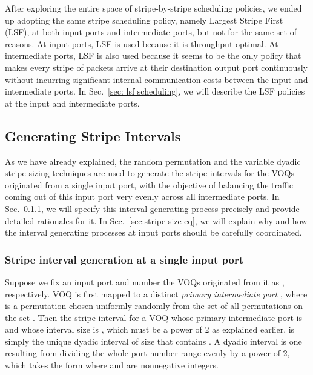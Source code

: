After exploring the entire space of stripe-by-stripe scheduling policies,
we ended up adopting the same stripe scheduling policy, namely Largest Stripe First (LSF),
at both input ports and intermediate ports, but not for the same set of reasons.
At input ports, LSF is used because it is throughput optimal.
At intermediate ports,
LSF is also used because it seems to be the only policy that makes every stripe of packets arrive at their destination output port
continuously without incurring significant internal communication costs between the input and intermediate ports.
In Sec.~\ref{sec: lsf scheduling},
we will describe the LSF policies at the input and intermediate ports.



















\subsection{Generating Stripe Intervals}
\label{sec:stripe generation}



As we have already explained, the random permutation and the variable dyadic stripe sizing techniques are used to
generate the stripe intervals for the  VOQs originated from a single input port, with the objective of 
balancing the traffic coming out of this input port very evenly across all  intermediate ports.
In Sec.~\ref{subsec: size determination}, 
we will specify this interval generating process precisely and provide detailed rationales for it.  
In Sec.~\ref{sec:stripe size eq}, we will 
explain why and how the interval generating processes at  input ports should be carefully coordinated.

 
\subsubsection{Stripe interval generation at a single input port}
\label{subsec: size determination}

Suppose we fix an input port and number the  VOQs originated from it as , respectively.  
VOQ  is first mapped to a distinct {\it primary intermediate port}
, where  is a permutation chosen uniformly randomly from the set of all permutations on the set .  
Then the stripe interval for a VOQ  whose primary intermediate port is  and
whose interval size is , which must be a power of 2 as explained earlier, is simply the unique dyadic
interval of size  that contains .  A dyadic interval is one resulting from dividing the whole port number range 
 evenly by a power of 2, which takes the form
 where
 and  are nonnegative integers.

